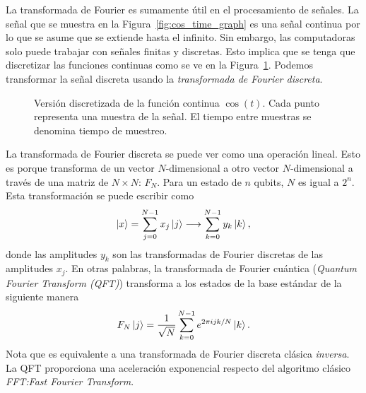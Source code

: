 La transformada de Fourier es sumamente útil en el procesamiento de señales. La señal que se muestra en la Figura~\ref{fig:cos_time_graph} es una señal continua por lo que se asume que se extiende hasta el infinito. Sin embargo, las computadoras solo puede trabajar con señales finitas y discretas. Esto implica que se tenga que discretizar las funciones continuas como se ve en la Figura~\ref{fig:cos_discrete_time_graph}. Podemos transformar la señal discreta usando la \emph{transformada de Fourier discreta}.
\begin{figure}[ht]
  \centering
  \caption{Versión discretizada de la función continua $\cos(t)$. Cada punto representa una muestra de la señal. El tiempo entre muestras se denomina tiempo de muestreo.}
  \label{fig:cos_discrete_time_graph}
\end{figure}

La transformada de Fourier discreta se puede ver como una operación lineal. Esto es porque transforma de un vector $N$-dimensional a otro vector $N$-dimensional a través de una matriz de $N \times N$: $F_N$. Para un estado de $n$ qubits, $N$ es igual a $2^n$. Esta transformación se puede escribir como
\begin{equation}
  \ket{x} = \sum_{j=0}^{N-1}x_j\ket{j} \longrightarrow \sum_{k=0}^{N-1}y_k\ket{k},
\end{equation}
donde las amplitudes $y_k$ son las transformadas de Fourier discretas de las amplitudes $x_j$. 
En otras palabras, la transformada de Fourier cuántica (\emph{Quantum Fourier Transform (QFT)}) transforma a los estados de la base estándar de la siguiente manera
\begin{equation} \label{eq:qft}
  F_N\ket{j} = \dfrac{1}{\sqrt N}\sum_{k=0}^{N-1}e^{2\pi i jk/N}\ket{k}.
\end{equation}
Nota que es equivalente a una transformada de Fourier discreta clásica \emph{inversa}. 
La QFT proporciona una aceleración exponencial respecto del algoritmo clásico \emph{FFT:Fast Fourier Transform}.

